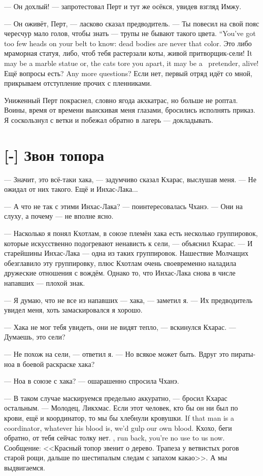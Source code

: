--- Он дохлый! --- запротестовал Перт и тут же осёкся, увидев взгляд Имжу.

--- Он оживёт, Перт, --- ласково сказал предводитель.
{--- Ты повесил на свой пояс чересчур мало голов, чтобы знать --- трупы не бывают такого цвета.}
{``You've got too few heads on your belt to know: dead bodies are never that color.}
{Это либо мраморная статуя, либо, чтоб тебя растерзали коты, живой притворщик-сели!}
{It may be a marble statue or, the cats tore you apart, it may be a \Seli\ pretender, alive!}
{Ещё вопросы есть?}
{Any more questions?}
Если нет, первый отряд идёт со мной, прикрываем отступление прочих с пленниками.

Униженный Перт покраснел, словно ягода акхкатрас, но больше не роптал.
Воины, время от времени выискивая меня глазами, бросились исполнять приказ.
Я соскользнул с ветки и побежал обратно в лагерь --- докладывать.

\section{[-] Звон топора}

--- Значит, это всё-таки хака, --- задумчиво сказал Кхарас, выслушав меня.
--- Не ожидал от них такого.
Ещё и Инхас-Лака...

--- А что не так с этими Инхас-Лака? --- поинтересовалась Чханэ.
--- Они на слуху, а почему --- не вполне ясно.

--- Насколько я понял Кхотлам, в союзе племён хака есть несколько группировок, которые искусственно подогревают ненависть к сели, --- объяснил Кхарас.
--- И старейшины Инхас-Лака --- одна из таких группировок.
Нашествие Молчащих обезглавило эту группировку, плюс Кхотлам очень своевременно наладила дружеские отношения с вождём.
Однако то, что Инхас-Лака снова в числе напавших --- плохой знак.

--- Я думаю, что не все из напавших --- хака, --- заметил я.
--- Их предводитель увидел меня, хоть замаскировался я хорошо.

--- Хака не мог тебя увидеть, они не видят тепло, --- вскинулся Кхарас.
--- Думаешь, это сели?

--- Не похож на сели, --- ответил я.
--- Но всякое может быть.
Вдруг это пираты-ноа в боевой раскраске хака?

--- Ноа в союзе с хака? --- ошарашенно спросила Чханэ.

--- В таком случае маскируемся предельно аккуратно, --- бросил Кхарас остальным.
--- Молодец, Ликхмас.
{Если этот человек, кто бы он ни был по крови, ещё и координатор, то мы бы хлебнули кровушки.}
{If that man is a coordinator, whatever his blood is, we'd gulp our own blood.}
{Кхохо, беги обратно, от тебя сейчас толку нет.}
{\Kchoho, run back, you're no use to us now.}
Сообщение: <<Красный топор звенит о дерево.
Трапеза у ветвистых рогов старой рощи, дальше по шестипалым следам с запахом какао>>.
А мы выдвигаемся.

